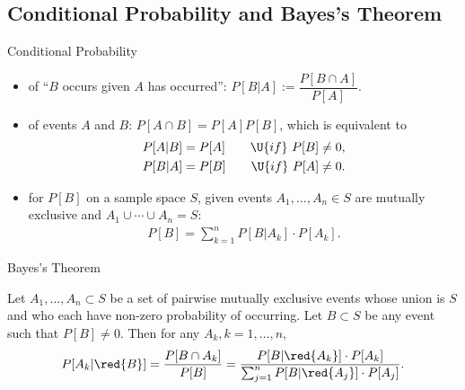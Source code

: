 \subsection{Conditional Probability and Bayes's Theorem}

\begin{frame}{Conditional Probability}

\begin{itemize}
	\justifying
	\item {} of ``$B$ occurs given $A$ has occurred'': $P[B|A] := \dfrac{P[B\cap A]}{P[A]}$.
	\item {} of events $A$ and $B$: $P[A\cap B] = P[A]P[B]$, which is equivalent to
	\begin{align*}
	P[A|B] = P[A] \qquad \U{if}\ P[B]\neq 0, \\
	P[B|A] = P[B] \qquad \U{if}\ P[A]\neq 0.
	\end{align*}
	\item {} for $P[B]$ on a sample space $S$, given events $A_1, \ldots, A_n \in S$ are mutually exclusive and $A_1\cup\cdots\cup A_n = S$:
	\begin{align*}
	P[B] = \sum_{k=1}^{n} P[B|A_k]\cdot P[A_k].
	\end{align*}
\end{itemize}

\end{frame}

\begin{frame}{Bayes's Theorem}

\justifying
{} Let $A_1, \ldots, A_n \subset S$ be a set of pairwise mutually exclusive events whose union is $S$ and who each have non-zero probability of occurring. Let $B\subset S$ be any event such that $P[B]\neq 0$. Then for any $A_k, k = 1, \ldots, n$,
\begin{align*}
P[A_k|\red{B}] = \frac{P[B\cap A_k]}{P[B]} = \frac{P[B|\red{A_k}]\cdot P[A_k]}{\sum_{j=1}^n P[B|\red{A_j}] \cdot P[A_j]}.
\end{align*}

\end{frame}


